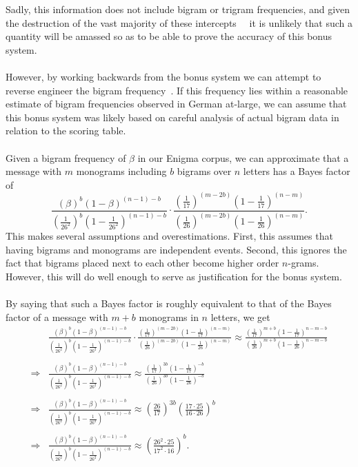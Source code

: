 Sadly, this information does not include bigram or trigram
frequencies, and given the destruction of the vast majority of
these intercepts~\cite[p.~29]{deutsch2006ultra}~\cite[p.~193]{sullivan-weierud} it
is unlikely that such a quantity will be amassed so as to be able
to prove the accuracy of this bonus system.
\\\\However, by working backwards from the bonus system we can attempt
to reverse engineer the bigram frequency~\cite{cryptoSEBanburismus}. If this frequency lies
within a reasonable estimate of bigram frequencies observed in
German at-large, we can assume that this bonus system was likely
based on careful analysis of actual bigram data in relation to the
scoring table.
\\\\Given a bigram frequency of $\beta$ in our Enigma corpus, we
can approximate that a message with $m$ monograms including $b$
bigrams over $n$ letters has a Bayes factor of
\[
  \frac{(\beta)^b(1-\beta)^{(n-1)-b}}{(\frac{1}{26^2})^b(1-\frac{1}{26^2})^{(n-1)-b}}\cdot\frac{(\frac{1}{17})^{(m-2b)}(1-\frac{1}{17})^{(n-m)}}{(\frac{1}{26})^{(m-2b)}(1-\frac{1}{26})^{(n-m)}}.
\]
This makes several assumptions and overestimations. First, this
assumes that having bigrams and monograms are independent events.
Second, this ignores the fact that bigrams placed next to each
other become higher order $n$-grams. However, this will do well
enough to serve as justification for the bonus system.
\\\\By saying that such a Bayes factor is roughly equivalent to
that of the Bayes factor of a message with $m+b$ monograms in $n$
letters, we get
\begin{align*}
  &
  \frac{(\beta)^b(1-\beta)^{(n-1)-b}}{(\frac{1}{26^2})^b(1-\frac{1}{26^2})^{(n-1)-b}}\cdot\frac{(\frac{1}{17})^{(m-2b)}(1-\frac{1}{17})^{(n-m)}}{(\frac{1}{26})^{(m-2b)}(1-\frac{1}{26})^{(n-m)}}
  \approx
  \frac{(\frac{1}{17})^{m+b}(1-\frac{1}{17})^{n-m-b}}{(\frac{1}{26})^{m+b}(1-\frac{1}{26})^{n-m-b}}
  \\\\
  \Rightarrow &
  \frac{(\beta)^b(1-\beta)^{(n-1)-b}}{(\frac{1}{26^2})^b(1-\frac{1}{26^2})^{(n-1)-b}}\approx
  \frac{(\frac{1}{17})^{3b}(1-\frac{1}{17})^{-b}}{(\frac{1}{26})^{3b}(1-\frac{1}{26})^{-b}}
  \\\\
  \Rightarrow &
  \frac{(\beta)^b(1-\beta)^{(n-1)-b}}{(\frac{1}{26^2})^b(1-\frac{1}{26^2})^{(n-1)-b}}\approx
  (\frac{26}{17})^{3b}(\frac{17\cdot25}{16\cdot26})^b
  \\\\
  \Rightarrow &
  \frac{(\beta)^b(1-\beta)^{(n-1)-b}}{(\frac{1}{26^2})^b(1-\frac{1}{26^2})^{(n-1)-b}}\approx
  (\frac{26^2\cdot25}{17^2\cdot16})^b.
\end{align*}

